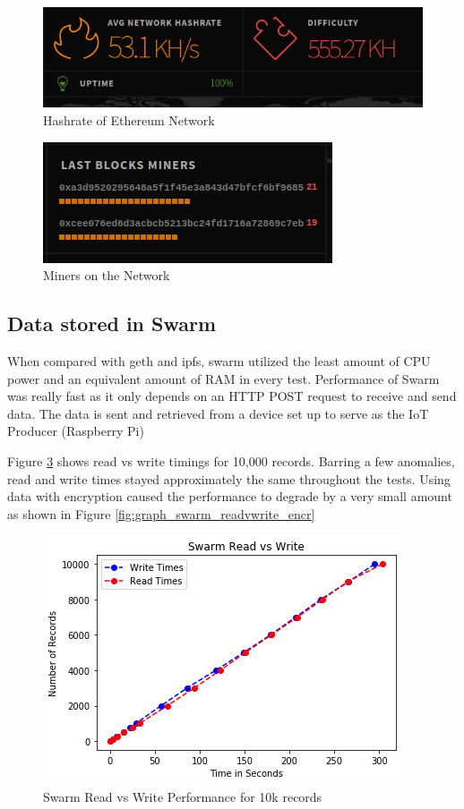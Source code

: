 \documentclass[11pt,openright]{report}
\begin{document}
\begin{figure}
    \centering
    \includegraphics[scale=1]{results/hashrate.png}
    \caption{Hashrate of Ethereum Network}
    \label{fig:eth_hashrate}
\end{figure}

\begin{figure}
    \centering
    \includegraphics[scale=1]{results/miners.png}
    \caption{Miners on the Network}
    \label{fig:eth_miners}
\end{figure}

\subsection{Data stored in Swarm}
When compared with geth and ipfs, swarm utilized the least amount of CPU power and an equivalent amount of RAM in every test. Performance of Swarm was really fast as it only depends on an HTTP POST request to receive and send data. The data is sent and retrieved from a device set up to serve as the IoT Producer (Raspberry Pi)

Figure \ref{fig:graph_swarm_readvwrite} shows read vs write timings for 10,000 records. Barring a few anomalies, read and write times stayed approximately the same throughout the tests. Using data with encryption caused the performance to degrade by a very small amount as shown in Figure \ref{fig:graph_swarm_readvwrite_encr}

\begin{figure}
    \centering
    \includegraphics[scale=1]{results/graphs/Swarm_Read_v_Write.png}
    \caption{Swarm Read vs Write Performance for 10k records}
    \label{fig:graph_swarm_readvwrite}
\end{figure}
\end{document}
